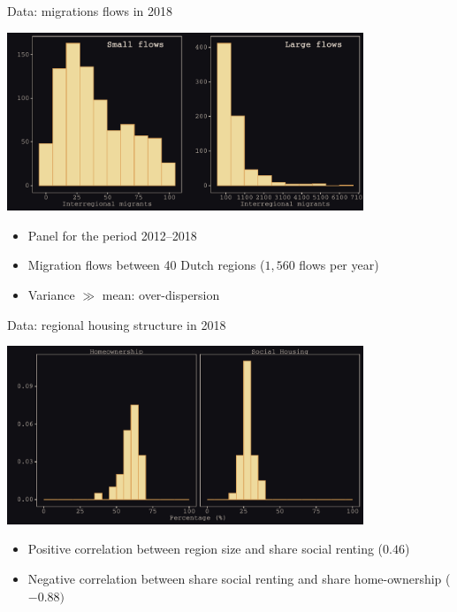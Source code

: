 \documentclass{beamer}
\begin{document}
\begin{frame}{Data: migrations flows in 2018}
	\begin{center}
		\includegraphics[width=0.8\textwidth]{../../fig/hist_mig_corop}      
	\end{center}
\begin{itemize}
	\item Panel for the period 2012--2018
	\item Migration flows \alert{between} 40 Dutch regions ($1,560$ flows per year)
	\item Variance $\gg$ mean: \alert{over-dispersion}
\end{itemize}
\end{frame}

\begin{frame}{Data: regional housing structure in 2018}
\begin{center}
	\includegraphics[width=0.8\textwidth]{../../fig/hist_housing_corop}
\end{center}
\begin{itemize}
	\item Positive correlation between region size and share social renting ($0.46$)
	\item Negative correlation between share social renting and share home-ownership ($-0.88)$
\end{itemize}
\end{frame}
\end{document}
